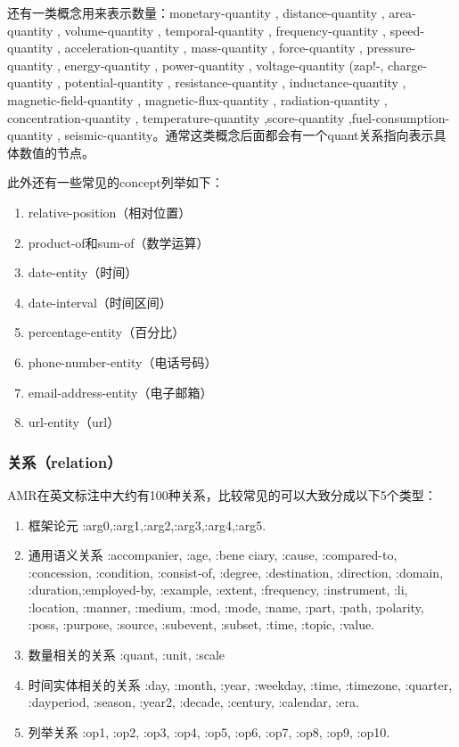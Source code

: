 \documentclass[master, winfont]{njuthesis}
\begin{document}
还有一类概念用来表示数量：monetary-quantity , distance-quantity , area-quantity , volume-quantity , temporal-quantity , frequency-quantity , speed-quantity , acceleration-quantity , mass-quantity , force-quantity , pressure-quantity , energy-quantity , power-quantity , voltage-quantity (zap!-, charge-quantity , potential-quantity , resistance-quantity , inductance-quantity , magnetic-field-quantity , magnetic-flux-quantity , radiation-quantity , concentration-quantity , temperature-quantity ,score-quantity ,fuel-consumption-quantity , seismic-quantity。通常这类概念后面都会有一个quant关系指向表示具体数值的节点。

此外还有一些常见的concept列举如下：
\begin{enumerate}
	\item relative-position（相对位置）
	\item product-of和sum-of（数学运算）
	\item date-entity（时间）
	\item date-interval（时间区间）
	\item percentage-entity（百分比）
	\item phone-number-entity（电话号码）
	\item email-address-entity（电子邮箱）
	\item url-entity（url）
\end{enumerate}

\subsubsection{关系（relation）}
AMR在英文标注中大约有100种关系，比较常见的可以大致分成以下5个类型：
\begin{enumerate}
	\item 框架论元 :arg0,:arg1,:arg2,:arg3,:arg4,:arg5.
	\item 通用语义关系 :accompanier, :age, :bene ciary, :cause, :compared-to, :concession, :condition, :consist-of, :degree, :destination, :direction, :domain, :duration,:employed-by, :example, :extent, :frequency, :instrument, :li, :location, :manner, :medium, :mod, :mode, :name, :part, :path, :polarity, :poss, :purpose, :source, :subevent, :subset, :time, :topic, :value.
	\item 数量相关的关系 :quant, :unit, :scale
	\item 时间实体相关的关系 :day, :month, :year, :weekday, :time, :timezone, :quarter, :dayperiod, :season, :year2, :decade, :century, :calendar, :era.
	\item 列举关系 :op1, :op2, :op3, :op4, :op5, :op6, :op7, :op8, :op9,
:op10.
\end{enumerate}
\end{document}
